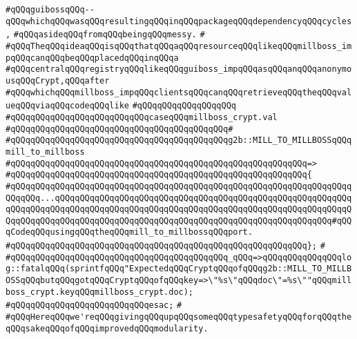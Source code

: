 \verb|#qQQqguibossqQQq--qQQqwhichqQQqwasqQQqresultingqQQqinqQQqpackageqQQqdependencyqQQqcycles,|\newline
\verb|#qQQqasideqQQqfromqQQqbeingqQQqmessy.|\newline
\verb|#|\newline
\verb|#qQQqTheqQQqideaqQQqisqQQqthatqQQqaqQQqresourceqQQqlikeqQQqmillboss_impqQQqcanqQQqbeqQQqplacedqQQqinqQQqa|\newline
\verb|#qQQqcentralqQQqregistryqQQqlikeqQQqguiboss_impqQQqasqQQqanqQQqanonymousqQQqCrypt,qQQqafter|\newline
\verb|#qQQqwhichqQQqmillboss_impqQQqclientsqQQqcanqQQqretrieveqQQqtheqQQqvalueqQQqviaqQQqcodeqQQqlike|\newline
\verb|#qQQqqQQqqQQqqQQqqQQq|\newline
\verb|#qQQqqQQqqQQqqQQqqQQqqQQqqQQqcaseqQQqmillboss_crypt.val|\newline
\verb|#qQQqqQQqqQQqqQQqqQQqqQQqqQQqqQQqqQQqqQQqqQQq#|\newline
\verb|#qQQqqQQqqQQqqQQqqQQqqQQqqQQqqQQqqQQqqQQqqQQqg2b::MILL_TO_MILLBOSSqQQqmill_to_millboss|\newline
\verb|#qQQqqQQqqQQqqQQqqQQqqQQqqQQqqQQqqQQqqQQqqQQqqQQqqQQqqQQqqQQq=>|\newline
\verb|#qQQqqQQqqQQqqQQqqQQqqQQqqQQqqQQqqQQqqQQqqQQqqQQqqQQqqQQqqQQq{|\newline
\verb|#qQQqqQQqqQQqqQQqqQQqqQQqqQQqqQQqqQQqqQQqqQQqqQQqqQQqqQQqqQQqqQQqqQQqqQQqqQQq...qQQqqQQqqQQqqQQqqQQqqQQqqQQqqQQqqQQqqQQqqQQqqQQqqQQqqQQqqQQqqQQqqQQqqQQqqQQqqQQqqQQqqQQqqQQqqQQqqQQqqQQqqQQqqQQqqQQqqQQqqQQqqQQqqQQqqQQqqQQqqQQqqQQqqQQqqQQqqQQqqQQqqQQqqQQqqQQqqQQqqQQqqQQqqQQqqQQq#qQQqCodeqQQqusingqQQqtheqQQqmill_to_millbossqQQqport.|\newline
\verb|#qQQqqQQqqQQqqQQqqQQqqQQqqQQqqQQqqQQqqQQqqQQqqQQqqQQqqQQqqQQq};|\newline
\verb|#|\newline
\verb|#qQQqqQQqqQQqqQQqqQQqqQQqqQQqqQQqqQQqqQQqqQQq_qQQq=>qQQqqQQqqQQqqQQqlog::fatalqQQq(sprintfqQQq"ExpectedqQQqCryptqQQqofqQQqg2b::MILL_TO_MILLBOSSqQQqbutqQQqgotqQQqCryptqQQqofqQQqkey=>\"%s\"qQQqdoc\"=%s\""qQQqmillboss_crypt.keyqQQqmillboss_crypt.doc);|\newline
\verb|#qQQqqQQqqQQqqQQqqQQqqQQqqQQqesac;|\newline
\verb|#|\newline
\verb|#qQQqHereqQQqwe'reqQQqgivingqQQqupqQQqsomeqQQqtypesafetyqQQqforqQQqtheqQQqsakeqQQqofqQQqimprovedqQQqmodularity.|\newline
